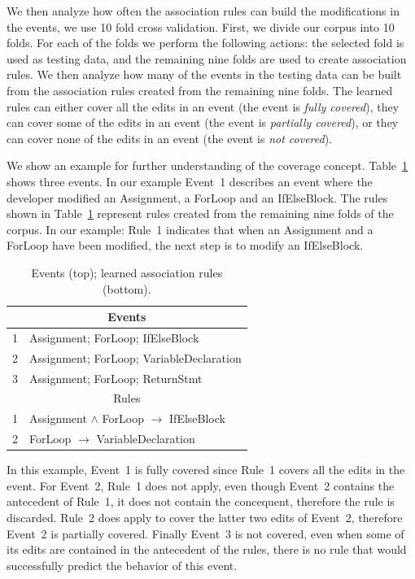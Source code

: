 \documentclass[sigconf]{acmart}
\begin{document}
We then analyze how often the association rules can build the 
modifications in the events, we use 10 fold cross validation.
First, we divide our corpus into 10 folds.
For each of the folds we perform the following actions:
the selected fold is used as testing data, and the
remaining nine folds are used to create association rules.
We then analyze how many of the events in the testing data
can be built from the association 
rules created from the remaining nine folds.
The learned rules can either cover all the edits in an event (the 
event is \emph{fully covered}), they can cover some of the edits in an 
event (the event is \emph{partially covered}), or they can cover none of
the edits in an event (the event is \emph{not covered}).

We show an example for further understanding of the coverage concept.
Table~\ref{rulesandinstances} shows three events. In 
our example Event~1 describes an event
where the developer modified an Assignment, a ForLoop and an IfElseBlock.
The rules shown in Table~\ref{rulesandinstances} represent rules created
from the remaining nine folds of the corpus. In our example: Rule~1 
indicates that when an Assignment and a ForLoop have been modified,
the next step is to modify an IfElseBlock.


\begin{table}[ht]
  \centering
  \caption{Events (top); learned association rules (bottom). \label{rulesandinstances}}{\small
\begin{tabular}{ll}
\toprule
\multicolumn{2}{c}{Events} \\
\midrule
1 & Assignment; ForLoop; IfElseBlock  \\
2 & Assignment; ForLoop; VariableDeclaration\\  
3 & Assignment; ForLoop;  ReturnStmt \\
\midrule
 \multicolumn{2}{c}{Rules} \\                     
\midrule
1 & Assignment $\wedge$ ForLoop $\rightarrow$ IfElseBlock \\  
2 & ForLoop $\rightarrow$ VariableDeclaration \\   
\bottomrule
\end{tabular}

}
\end{table}

In this example, Event~1 is fully covered since Rule~1 covers all
the edits in the event. For Event~2, Rule~1 does not apply, even though
Event~2 contains the antecedent of Rule~1, it does not contain the 
concequent, therefore the rule is discarded. Rule~2 does apply to 
cover the latter two
edits of Event~2,
therefore Event~2 is partially covered. Finally Event~3 is not covered,
even when some of its edits are contained in the antecedent of the rules,
there is no rule that would successfully predict the behavior of this 
event. 
\end{document}
